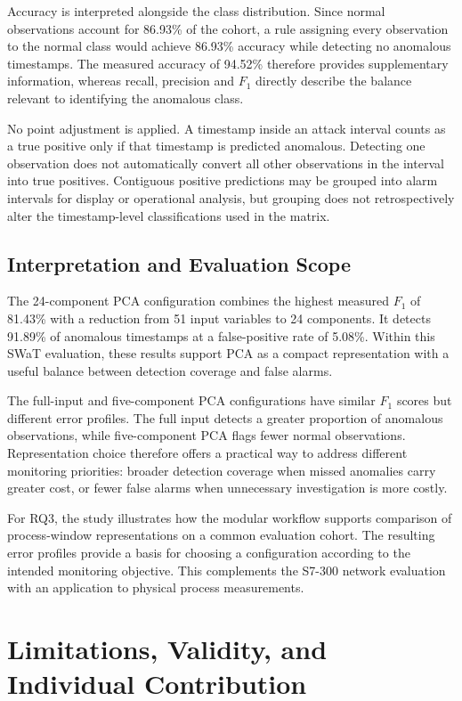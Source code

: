 Accuracy is interpreted alongside the class distribution. Since normal observations account for
86.93\% of the cohort, a rule assigning every observation to the normal class would achieve
86.93\% accuracy while detecting no anomalous timestamps. The measured accuracy of 94.52\%
therefore provides supplementary information, whereas recall, precision and $F_1$ directly
describe the balance relevant to identifying the anomalous class.

No point adjustment is applied. A timestamp inside an attack interval counts as a true
positive only if that timestamp is predicted anomalous. Detecting one observation does not
automatically convert all other observations in the interval into true positives. Contiguous
positive predictions may be grouped into alarm intervals for display or operational analysis,
but grouping does not retrospectively alter the timestamp-level classifications used in the
matrix.

\subsection{Interpretation and Evaluation Scope}
\label{sec:anomaly:gan-scope}

The 24-component PCA configuration combines the highest measured $F_1$ of 81.43\% with a
reduction from 51 input variables to 24 components. It detects 91.89\% of anomalous timestamps
at a false-positive rate of 5.08\%. Within this SWaT evaluation, these results support PCA as
a compact representation with a useful balance between detection coverage and false alarms.

The full-input and five-component PCA configurations have similar $F_1$ scores but different
error profiles. The full input detects a greater proportion of anomalous observations, while
five-component PCA flags fewer normal observations. Representation choice therefore offers a
practical way to address different monitoring priorities: broader detection coverage when
missed anomalies carry greater cost, or fewer false alarms when unnecessary investigation is
more costly.

For RQ3, the study illustrates how the modular workflow supports comparison of process-window
representations on a common evaluation cohort. The resulting error profiles provide a basis for
choosing a configuration according to the intended monitoring objective. This complements the
S7-300 network evaluation with an application to physical process measurements.

\section{Limitations, Validity, and Individual Contribution}
\label{sec:anomaly:limitations}


